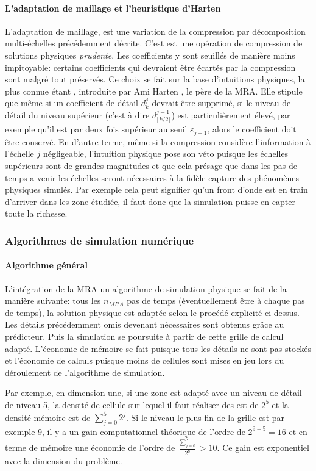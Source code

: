     \paragraph{L'adaptation de maillage et l'heuristique d'Harten}
            L'adaptation de maillage, est une variation de la compression par décomposition multi-échelles précédemment décrite. 
            C'est est une opération de compression de solutions physiques \textit{prudente}.
            Les coefficients y sont seuillés de manière moins impitoyable: certains coefficients qui devraient être écartés
            par la compression sont malgré tout préservés. Ce choix se fait sur la base d'intuitions physiques, 
            la plus connue étant , introduite par Ami Harten \cite{harten1994}, le père de la MRA.
            Elle stipule que même si un coefficient de détail $d_k^j$ devrait être supprimé, si le niveau de détail du niveau supérieur 
            (c'est à dire $d^{j-1}_{\lfloor k/2 \rfloor}$) est particulièrement élevé, par exemple qu'il est par deux fois supérieur au seuil $\varepsilon_{j-1}$,
            alors le coefficient doit être conservé. En d'autre terme, même si la compression considère l'information à l'échelle $j$ négligeable,
            l'intuition physique pose son véto puisque les échelles supérieurs sont de grandes magnitudes et que cela présage que dans 
            les pas de temps a venir les échelles seront nécessaires à la fidèle capture des phénomènes physiques simulés. Par exemple cela peut signifier qu'un front
            d'onde est en train d'arriver dans les zone étudiée, il faut donc que la simulation puisse en capter toute la richesse.
\subsubsection{Algorithmes de simulation numérique}
    \paragraph{Algorithme général}
            L'intégration de la MRA un algorithme de simulation physique se fait de la manière suivante: 
            tous les $n_{MRA}$ pas de temps (éventuellement être à chaque pas de temps), 
            la solution physique est adaptée selon le procédé explicité ci-dessus. Les détails précédemment omis
            devenant nécessaires sont obtenus grâce au prédicteur. Puis la simulation se poursuite à partir de cette grille de calcul adapté.
            L'économie de mémoire se fait puisque tous les détails ne sont pas stockés et l'économie de calculs puisque moins de cellules sont mises en 
            jeu lors du déroulement de l’algorithme de simulation.\par
            Par exemple, en dimension une, si une zone est adapté avec un niveau de détail de niveau 5, la densité de cellule sur lequel il faut réaliser des est de $2^5$
            et la densité mémoire est de $\sum_{j=0}^5 2^j$. Si le niveau le plus fin de la grille est par exemple 9, il y a un gain computationnel théorique de l'ordre de 
            $2^{9-5}=16$ et en terme de mémoire une économie de l'ordre de $\frac{\sum_{j=0}^5}{2^8} > 10$. Ce gain est exponentiel avec la dimension du problème.
